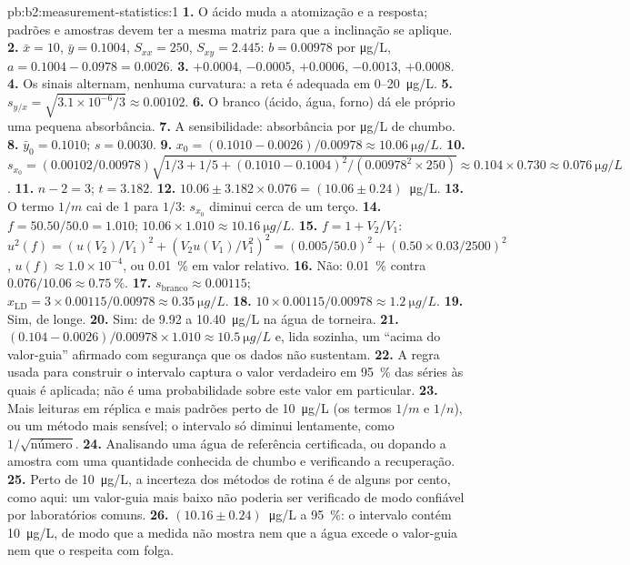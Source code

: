 \begin{solution}{pb:b2:measurement-statistics:1}
\textbf{1.} O ácido muda a atomização e a resposta; padrões e amostras devem ter a mesma
matriz para que a inclinação se aplique.
\textbf{2.} $\bar x = 10$, $\bar y = 0.1004$, $S_{xx} = 250$, $S_{xy} = 2.445$: $b = 0.00978$ por
\unit{\micro g/L}, $a = 0.1004 - 0.0978 = 0.0026$.
\textbf{3.} $+0.0004$, $-0.0005$, $+0.0006$, $-0.0013$, $+0.0008$.
\textbf{4.} Os sinais alternam, nenhuma curvatura: a reta é adequada em 0--\qty{20}{\micro g/L}.
\textbf{5.} $s_{y/x} = \sqrt{3.1 \times 10^{-6}/3} \approx 0.00102$.
\textbf{6.} O branco (ácido, água, forno) dá ele próprio uma pequena absorbância.
\textbf{7.} A sensibilidade: absorbância por \unit{\micro g/L} de chumbo.
\textbf{8.} $\bar y_0 = 0.1010$; $s = 0.0030$.
\textbf{9.} $x_0 = (0.1010 - 0.0026)/0.00978 \approx \qty{10.06}{\micro g/L}$.
\textbf{10.} $s_{x_0} = (0.00102/0.00978)\sqrt{1/3 + 1/5 + (0.1010 - 0.1004)^2/(0.00978^2 \times 250)}
\approx 0.104 \times 0.730 \approx \qty{0.076}{\micro g/L}$.
\textbf{11.} $n - 2 = 3$; $t = 3.182$.
\textbf{12.} $10.06 \pm 3.182 \times 0.076 = (10.06 \pm 0.24)$~\unit{\micro g/L}.
\textbf{13.} O termo $1/m$ cai de 1 para $1/3$: $s_{x_0}$ diminui cerca de um terço.
\textbf{14.} $f = 50.50/50.0 = 1.010$; $10.06 \times 1.010 \approx \qty{10.16}{\micro g/L}$.
\textbf{15.} $f = 1 + V_2/V_1$: $u^2(f) = (u(V_2)/V_1)^2 + (V_2u(V_1)/V_1^2)^2 = (0.005/50.0)^2 +
(0.50 \times 0.03/2500)^2$, $u(f) \approx 1.0 \times 10^{-4}$, ou 0.01~\% em valor relativo.
\textbf{16.} Não: 0.01~\% contra $0.076/10.06 \approx 0.75~\%$.
\textbf{17.} $s_{\mathrm{branco}} \approx 0.00115$; $x_{\mathrm{LD}} = 3 \times 0.00115/0.00978 \approx
\qty{0.35}{\micro g/L}$.
\textbf{18.} $10 \times 0.00115/0.00978 \approx \qty{1.2}{\micro g/L}$.
\textbf{19.} Sim, de longe.
\textbf{20.} Sim: de 9.92 a \qty{10.40}{\micro g/L} na água de torneira.
\textbf{21.} $(0.104 - 0.0026)/0.00978 \times 1.010 \approx \qty{10.5}{\micro g/L}$ e, lida sozinha,
um ``acima do valor-guia'' afirmado com segurança que os dados não sustentam.
\textbf{22.} A regra usada para construir o intervalo captura o valor verdadeiro em 95~\% das séries
às quais é aplicada; não é uma probabilidade sobre este valor em particular.
\textbf{23.} Mais leituras em réplica e mais padrões perto de \qty{10}{\micro g/L} (os termos $1/m$ e
$1/n$), ou um método mais sensível; o intervalo só diminui lentamente, como $1/\sqrt{\text{número}}$.
\textbf{24.} Analisando uma água de referência certificada, ou dopando a amostra com uma quantidade
conhecida de chumbo e verificando a recuperação.
\textbf{25.} Perto de \qty{10}{\micro g/L}, a incerteza dos métodos de rotina é de alguns por cento, como
aqui: um valor-guia mais baixo não poderia ser verificado de modo confiável por laboratórios comuns.
\textbf{26.} $\boldsymbol{(10.16 \pm 0.24)}$~\unit{\micro g/L} a 95~\%: o intervalo contém
\qty{10}{\micro g/L}, de modo que a medida não mostra nem que a água excede o valor-guia nem que o
respeita com folga.
\end{solution}
